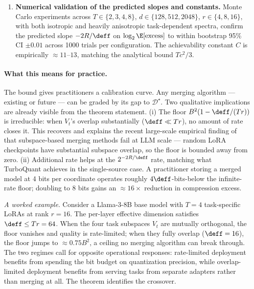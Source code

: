 \begin{enumerate}[leftmargin=*,topsep=2pt,itemsep=2pt]
\item \textbf{Numerical validation of the predicted slopes and
constants.} Monte Carlo experiments across $T\in\{2,3,4,8\}$,
$d\in\{128,512,2048\}$, $r\in\{4,8,16\}$, with both isotropic
and heavily anisotropic task-dependent spectra, confirm the
predicted slope $-2R/\deff$ on $\log_2\E[\text{excess}]$ to
within bootstrap 95\% CI $\pm 0.01$ across 1000 trials per
configuration. The achievability constant $C$ is empirically
$\approx 11$--$13$, matching the analytical bound $Tc^2/3$.
\end{enumerate}

\paragraph{What this means for practice.} The bound gives
practitioners a calibration curve. Any merging algorithm —
existing or future — can be graded by its gap to
$\mathcal{D}^\star$. Two qualitative implications are already
visible from the theorem statement. (i) The floor
$B^2(1 - \deff/(Tr))$ is irreducible: when $V_t$'s overlap
substantially ($\deff\ll Tr$), no amount of rate closes it.
This recovers and explains the recent large-scale empirical
finding of~\cite{systematic2025merging} that subspace-based
merging methods fail at LLM scale — random LoRA checkpoints
have substantial subspace overlap, so the floor is bounded
away from zero. (ii) Additional rate helps at the
$2^{-2R/\deff}$ rate, matching what TurboQuant achieves in
the single-source case. A practitioner storing a merged
model at 4 bits per coordinate operates roughly
$4\deff$-bits-below the infinite-rate floor; doubling to
8 bits gains an $\approx 16\times$ reduction in compression
excess.

\emph{A worked example.} Consider a Llama-3-8B base model with
$T=4$ task-specific LoRAs at rank $r=16$. The per-layer
effective dimension satisfies $\deff\leq Tr = 64$. When the
four task subspaces $V_t$ are mutually orthogonal, the floor
vanishes and quality is rate-limited; when they fully overlap
($\deff = 16$), the floor jumps to $\approx 0.75 B^2$, a
ceiling no merging algorithm can break through. The two
regimes call for opposite operational responses: rate-limited
deployment benefits from spending the bit budget on
quantization precision, while overlap-limited deployment
benefits from serving tasks from separate adapters rather than
merging at all. The theorem identifies the crossover.


